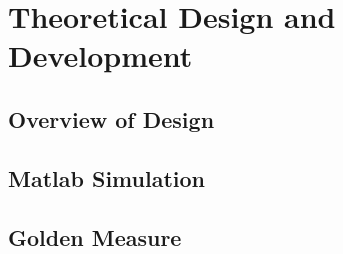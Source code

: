 \chapter{Theoretical Design and Development}
\label{ch:theory}
\section{Overview of Design}

\section{Matlab Simulation}

\section{Golden Measure}

